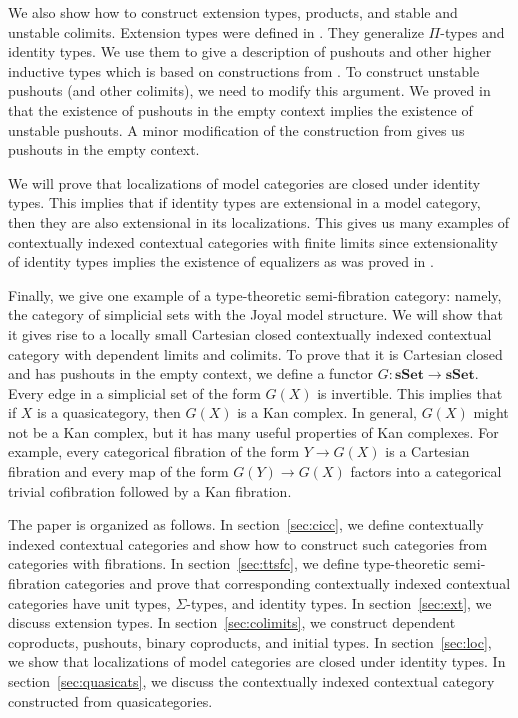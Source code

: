\documentclass[reqno]{amsart}
\theoremstyle{definition}
\theoremstyle{remark}
\newcommand{\cat}[1]{\mathbf{#1}}
\newcommand{\sSet}{\cat{sSet}}
\numberwithin{figure}{section}
\begin{document}
We also show how to construct extension types, products, and stable and unstable colimits.
Extension types were defined in \cite{riehl-dhott}.
They generalize $\Pi$-types and identity types.
We use them to give a description of pushouts and other higher inductive types which is based on constructions from \cite{lum-shul-hits}.
To construct unstable pushouts (and other colimits), we need to modify this argument.
We proved in \cite{indexed-tt} that the existence of pushouts in the empty context implies the existence of unstable pushouts.
A minor modification of the construction from \cite{lum-shul-hits} gives us pushouts in the empty context.

We will prove that localizations of model categories are closed under identity types.
This implies that if identity types are extensional in a model category, then they are also extensional in its localizations.
This gives us many examples of contextually indexed contextual categories with finite limits since extensionality of identity types implies the existence of equalizers as was proved in \cite{indexed-tt}.

Finally, we give one example of a type-theoretic semi-fibration category: namely, the category of simplicial sets with the Joyal model structure.
We will show that it gives rise to a locally small Cartesian closed contextually indexed contextual category with dependent limits and colimits.
To prove that it is Cartesian closed and has pushouts in the empty context, we define a functor $G : \sSet \to \sSet$.
Every edge in a simplicial set of the form $G(X)$ is invertible.
This implies that if $X$ is a quasicategory, then $G(X)$ is a Kan complex.
In general, $G(X)$ might not be a Kan complex, but it has many useful properties of Kan complexes.
For example, every categorical fibration of the form $Y \to G(X)$ is a Cartesian fibration and every map of the form $G(Y) \to G(X)$ factors into a categorical trivial cofibration followed by a Kan fibration.

The paper is organized as follows.
In section~\ref{sec:cicc}, we define contextually indexed contextual categories and show how to construct such categories from categories with fibrations.
In section~\ref{sec:ttsfc}, we define type-theoretic semi-fibration categories and prove that corresponding contextually indexed contextual categories have unit types, $\Sigma$-types, and identity types.
In section~\ref{sec:ext}, we discuss extension types.
In section~\ref{sec:colimits}, we construct dependent coproducts, pushouts, binary coproducts, and initial types.
In section~\ref{sec:loc}, we show that localizations of model categories are closed under identity types.
In section~\ref{sec:quasicats}, we discuss the contextually indexed contextual category constructed from quasicategories.
\end{document}
